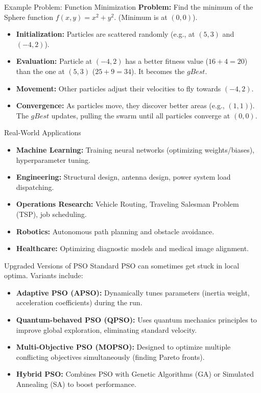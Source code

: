 \documentclass{beamer}
\begin{document}
\begin{frame}{Example Problem: Function Minimization}
    \textbf{Problem:} Find the minimum of the Sphere function $f(x, y) = x^2 + y^2$. (Minimum is at $(0,0)$).
    \vspace{0.3cm}
    \begin{itemize}
        \item \textbf{Initialization:} Particles are scattered randomly (e.g., at $(5,3)$ and $(-4,2)$).
        \item \textbf{Evaluation:} Particle at $(-4,2)$ has a better fitness value ($16+4=20$) than the one at $(5,3)$ ($25+9=34$). It becomes the $gBest$.
        \item \textbf{Movement:} Other particles adjust their velocities to fly towards $(-4,2)$.
        \item \textbf{Convergence:} As particles move, they discover better areas (e.g., $(1,1)$). The $gBest$ updates, pulling the swarm until all particles converge at $(0,0)$.
    \end{itemize}
\end{frame}
\begin{frame}{Real-World Applications}
    \begin{itemize}
        \item \textbf{Machine Learning:} Training neural networks (optimizing weights/biases), hyperparameter tuning.
        \item \textbf{Engineering:} Structural design, antenna design, power system load dispatching.
        \item \textbf{Operations Research:} Vehicle Routing, Traveling Salesman Problem (TSP), job scheduling.
        \item \textbf{Robotics:} Autonomous path planning and obstacle avoidance.
        \item \textbf{Healthcare:} Optimizing diagnostic models and medical image alignment.
    \end{itemize}
\end{frame}
\begin{frame}{Upgraded Versions of PSO}
    Standard PSO can sometimes get stuck in local optima. Variants include:
    \vspace{0.3cm}
    \begin{itemize}
        \item \textbf{Adaptive PSO (APSO):} Dynamically tunes parameters (inertia weight, acceleration coefficients) during the run.
        \item \textbf{Quantum-behaved PSO (QPSO):} Uses quantum mechanics principles to improve global exploration, eliminating standard velocity.
        \item \textbf{Multi-Objective PSO (MOPSO):} Designed to optimize multiple conflicting objectives simultaneously (finding Pareto fronts).
        \item \textbf{Hybrid PSO:} Combines PSO with Genetic Algorithms (GA) or Simulated Annealing (SA) to boost performance.
    \end{itemize}
\end{frame}
\end{document}
